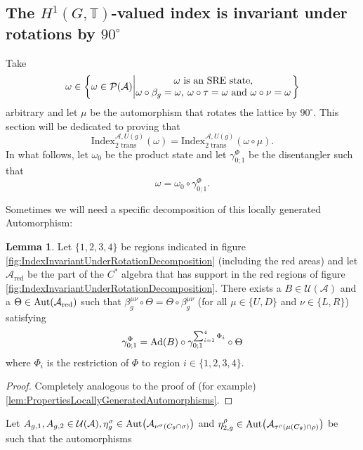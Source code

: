 \documentclass[12pt,a4paper,twoside]{article}
\let\originalleft\left
\let\originalright\right
\renewcommand{\left}{\mathopen{}\mathclose\bgroup\originalleft}
\renewcommand{\right}{\aftergroup\egroup\originalright}
\newcommand{\UU}{\mathcal U}
\newcommand{\PP}{\mathcal P}
\newcommand{\TT}{\mathbb T}
\renewcommand{\AA}{\mathcal A}
\newcommand{\Ad}[1]{\textrm{Ad}\left(#1\right)}
\newcommand{\Aut}[1]{\textrm{Aut}\left(#1\right)}
\theoremstyle{definition}
\newtheorem{lemma}[theorem]{Lemma}
\numberwithin{equation}{section}
\begin{document}
\subsection{The $H^1(G,\TT)$-valued index is invariant under rotations by $90^\circ$}
Take
\begin{equation}
	\omega\in\left\{\omega\in\PP(\AA)\left| \begin{matrix}\omega\text{ is an SRE state,}\\\omega\circ\beta_g=\omega,\:\omega\circ\tau=\omega\text{ and }\omega\circ\nu=\omega\end{matrix} \right.\right\}
\end{equation}
arbitrary and let $\mu$ be the automorphism that rotates the lattice by $90^\circ$. This section will be dedicated to proving that
\begin{equation}
	\textrm{Index}_{\text{2 trans}}^{\AA,U(g)}(\omega)=\textrm{Index}_{\text{2 trans}}^{\AA,U(g)}(\omega\circ\mu).
\end{equation}
In what follows, let $\omega_0$ be the product state and let $\gamma^\Phi_{0;1}$ be the disentangler such that
\begin{equation}
	\omega=\omega_0\circ\gamma^\Phi_{0;1}.
\end{equation}

Sometimes we will need a specific decomposition of this locally generated Automorphism:
\begin{lemma}\label{lem:DecompositionOfLGAInCross}
	Let $\{1,2,3,4\}$ be regions indicated in figure \ref{fig:IndexInvariantUnderRotationDecomposition} (including the red areas) and let $\AA_{\text{red}}$ be the part of the $C^*$ algebra that has support in the red regions of figure \ref{fig:IndexInvariantUnderRotationDecomposition}. There exists a $B\in\UU(\AA)$ and a $\Theta\in\Aut{\AA_{\text{red}}}$ such that $\beta^{\mu\nu}_g\circ\Theta=\Theta\circ\beta^{\mu\nu}_g$ (for all $\mu\in\{U,D\}$ and $\nu\in\{L,R\}$) satisfying
	\begin{equation}
		\gamma^\Phi_{0;1}=\Ad{B}\circ\gamma^{\sum_{i=1}^4\Phi_i}_{0;1}\circ\Theta
	\end{equation}
	where $\Phi_i$ is the restriction of $\Phi$ to region $i\in\{1,2,3,4\}$.
\end{lemma}
\begin{proof}
	Completely analogous to the proof of (for example) \ref{lem:PropertiesLocallyGeneratedAutomorphisms}.
\end{proof}
Let $A_{g,1},A_{g,2}\in\UU(\AA),\eta^\sigma_g\in\Aut{\AA_{\nu^{\sigma}(C_\theta\cap\sigma)}}$ and $\eta^\rho_{2,g}\in\Aut{\AA_{\tau^{\rho}(\mu(C_\theta)\cap\rho)}}$ be such that the automorphisms
\end{document}
